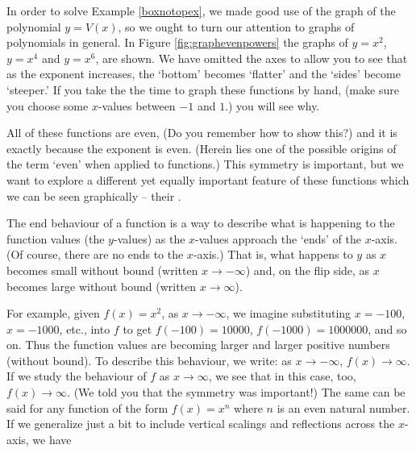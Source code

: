 \medskip

In order to solve Example \ref{boxnotopex}, we made good use of the graph of the polynomial $y=V(x)$, so we ought to turn our attention to graphs of polynomials in general.  In Figure \ref{fig:graphevenpowers} the graphs of $y=x^2$, $y=x^4$ and $y=x^6$, are shown.  We have omitted the axes to allow you to see that as the exponent increases, the `bottom' becomes `flatter' and the `sides' become `steeper.'  If you take the the time to graph these functions by hand, (make sure you choose some $x$-values between $-1$ and $1$.) you will see why. 

All of these functions are even, (Do you remember how to show this?) and it is exactly because the exponent is even. (Herein lies one of the possible origins of the term `even' when applied to functions.) This symmetry is important, but we want to explore a different yet equally important feature of these functions which we can be seen graphically -- their .  

\smallskip

The end behaviour of a function is a way to describe what is happening to the function values (the $y$-values) as the $x$-values approach the `ends' of the $x$-axis. (Of course, there are no ends to the $x$-axis.) That is, what happens to $y$ as $x$ becomes small without bound (written $x \rightarrow -\infty$) and, on the flip side, as $x$ becomes large without bound (written $x \rightarrow \infty$).  




\smallskip

For example, given $f(x) = x^2$, as $x \rightarrow -\infty$, we imagine substituting $x=-100$, $x=-1000$, etc., into $f$ to get $f(-100)=10000$, $f(-1000)=1000000$, and so on. Thus  the function values are becoming larger and larger positive numbers (without bound).  To describe this behaviour, we write: as $x \rightarrow -\infty$, $f(x) \rightarrow \infty$.  If we study the behaviour of $f$ as $x \rightarrow \infty$, we see that in this case, too, $f(x) \rightarrow \infty$. (We told you that the symmetry was important!) The same can be said for any function of the form $f(x) = x^n$ where $n$ is an even natural number.   If we generalize just a bit to include vertical scalings and reflections across the $x$-axis,  we have

